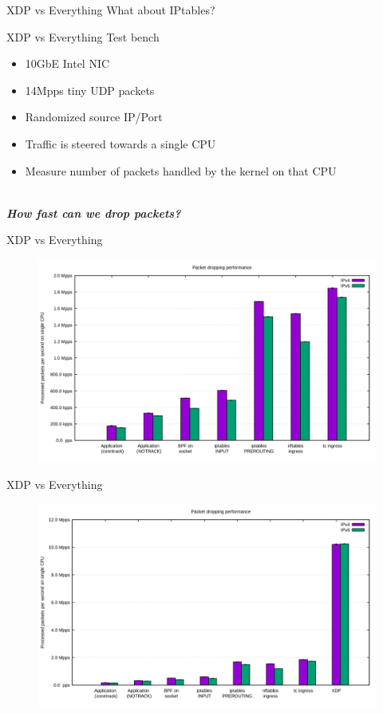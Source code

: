 \documentclass{beamer}
\begin{document}
\begin{frame}{XDP vs Everything}
  \Large{What about IPtables?}
\end{frame}

\begin{frame}{XDP vs Everything}
  Test bench
  \begin{itemize}
    \item 10GbE Intel NIC
    \item 14Mpps tiny UDP packets 
    \item Randomized source IP/Port
    \item Traffic is steered towards a single CPU
    \item Measure number of packets handled by the kernel on that CPU
  \end{itemize}

  \ \\
  \pause
  \textbf{\textit{How fast can we drop packets?}}
\end{frame}

\begin{frame}{XDP vs Everything}
  \begin{figure}
    \includegraphics[width=1.1\textwidth]{./no_xdp.png}
  \end{figure}
\end{frame}

\begin{frame}{XDP vs Everything}
  \begin{figure}
    \includegraphics[width=1.1\textwidth]{./with_xdp.png}
  \end{figure}
\end{frame}
\end{document}
